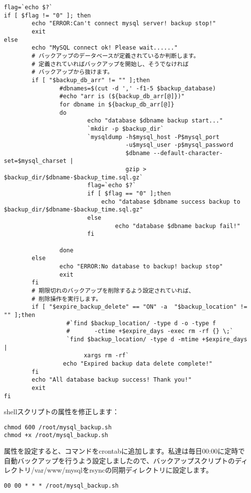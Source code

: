 \begin{lstlisting}[numbers=none]
flag=`echo $?`
if [ $flag != "0" ]; then
        echo "ERROR:Can't connect mysql server! backup stop!"
        exit
else
        echo "MySQL connect ok! Please wait......"
        # バックアップのデータベースが定義されているか判断します。
        # 定義されていればバックアップを開始し、そうでなければ
        # バックアップから抜けます。
        if [ "$backup_db_arr" != "" ];then
                #dbnames=$(cut -d ',' -f1-5 $backup_database)
                #echo "arr is (${backup_db_arr[@]})"
                for dbname in ${backup_db_arr[@]}
                do
                        echo "database $dbname backup start..."
                        `mkdir -p $backup_dir`
                        `mysqldump -h$mysql_host -P$mysql_port
                                   -u$mysql_user -p$mysql_password
                                   $dbname --default-character-set=$mysql_charset |
                                   gzip > $backup_dir/$dbname-$backup_time.sql.gz`
                        flag=`echo $?`
                        if [ $flag == "0" ];then
                            echo "database $dbname success backup to $backup_dir/$dbname-$backup_time.sql.gz"
                        else
                                echo "database $dbname backup fail!"
                        fi

                done
        else
                echo "ERROR:No database to backup! backup stop"
                exit
        fi
        # 期限切れのバックアップを削除するよう設定されていれば、
        # 削除操作を実行します。
        if [ "$expire_backup_delete" == "ON" -a  "$backup_location" != "" ];then
                  #`find $backup_location/ -type d -o -type f
                  #       -ctime +$expire_days -exec rm -rf {} \;`
                  `find $backup_location/ -type d -mtime +$expire_days |
                       xargs rm -rf`
                 echo "Expired backup data delete complete!"
        fi
        echo "All database backup success! Thank you!"
        exit
fi
\end{lstlisting}

shellスクリプトの属性を修正します：

\begin{lstlisting}[numbers=none]
chmod 600 /root/mysql_backup.sh
chmod +x /root/mysql_backup.sh
\end{lstlisting}

属性を設定すると、コマンドをcrontabに追加します。私達は毎日00:00に定時で自動バックアップを行うよう設定しましたので、バックアップスクリプトのディレクトリ/var/www/mysqlをrsyncの同期ディレクトリに設定します。

\begin{lstlisting}[numbers=none]
00 00 * * * /root/mysql_backup.sh
\end{lstlisting}

